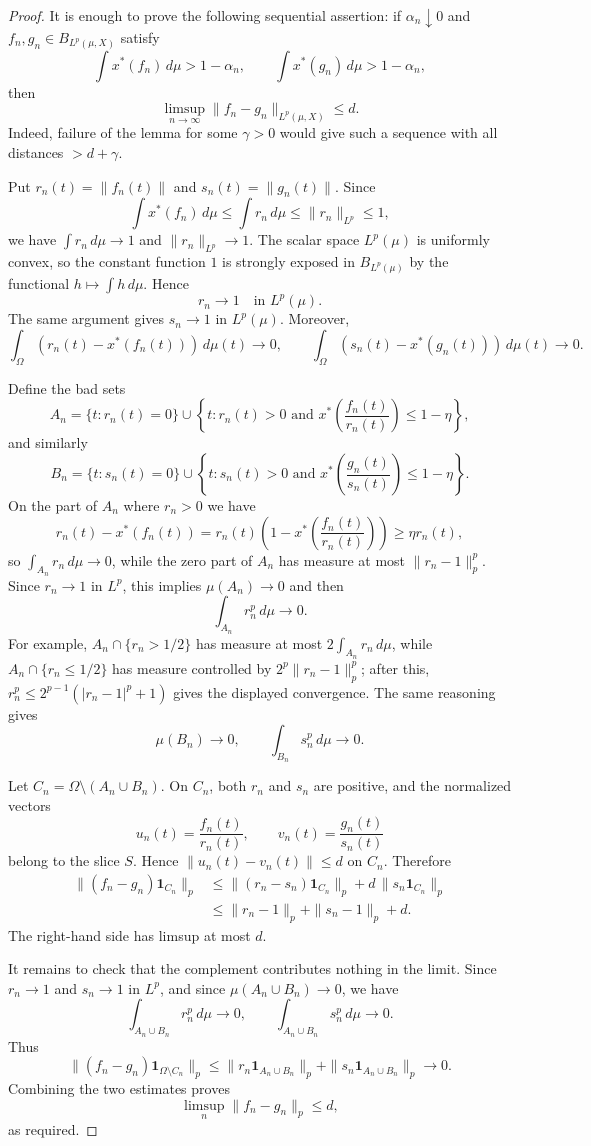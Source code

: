 \documentclass[11pt]{article}
\begin{document}
\begin{proof}
It is enough to prove the following sequential assertion: if \(\alpha_n\downarrow0\) and \(f_n,g_n\in B_{L^p(\mu,X)}\) satisfy
\[
  \int x^*(f_n)\,d\mu>1-\alpha_n,
  \qquad
  \int x^*(g_n)\,d\mu>1-\alpha_n,
\]
then
\[
  \limsup_{n\to\infty}\|f_n-g_n\|_{L^p(\mu,X)}\le d .
\]
Indeed, failure of the lemma for some \(\gamma>0\) would give such a sequence with all distances \(>d+\gamma\).

Put \(r_n(t)=\|f_n(t)\|\) and \(s_n(t)=\|g_n(t)\|\).  Since
\[
  \int x^*(f_n)\,d\mu
  \le \int r_n\,d\mu
  \le \|r_n\|_{L^p}
  \le 1,
\]
we have \(\int r_n\,d\mu\to1\) and \(\|r_n\|_{L^p}\to1\).  The scalar space \(L^p(\mu)\) is uniformly convex, so the constant function \(1\) is strongly exposed in \(B_{L^p(\mu)}\) by the functional \(h\mapsto\int h\,d\mu\).  Hence
\[
  r_n\to 1\quad\text{in }L^p(\mu).
\]
The same argument gives \(s_n\to1\) in \(L^p(\mu)\).  Moreover,
\[
  \int_\Omega (r_n(t)-x^*(f_n(t)))\,d\mu(t)\to0,
  \qquad
  \int_\Omega (s_n(t)-x^*(g_n(t)))\,d\mu(t)\to0.
\]

Define the bad sets
\[
  A_n=\{t:r_n(t)=0\}\cup\left\{t:r_n(t)>0\text{ and }
  x^*\!\left(\frac{f_n(t)}{r_n(t)}\right)\le1-\eta\right\},
\]
and similarly
\[
  B_n=\{t:s_n(t)=0\}\cup\left\{t:s_n(t)>0\text{ and }
  x^*\!\left(\frac{g_n(t)}{s_n(t)}\right)\le1-\eta\right\}.
\]
On the part of \(A_n\) where \(r_n>0\) we have
\[
  r_n(t)-x^*(f_n(t))
  =
  r_n(t)\left(1-x^*\!\left(\frac{f_n(t)}{r_n(t)}\right)\right)
  \ge \eta r_n(t),
\]
so \(\int_{A_n} r_n\,d\mu\to0\), while the zero part of \(A_n\) has measure at most \(\|r_n-1\|_p^p\).  Since \(r_n\to1\) in \(L^p\), this implies \(\mu(A_n)\to0\) and then
\[
  \int_{A_n} r_n^p\,d\mu\to0.
\]
For example, \(A_n\cap\{r_n>1/2\}\) has measure at most \(2\int_{A_n}r_n\,d\mu\), while \(A_n\cap\{r_n\le1/2\}\) has measure controlled by \(2^p\|r_n-1\|_p^p\); after this, \(r_n^p\le 2^{p-1}(|r_n-1|^p+1)\) gives the displayed convergence.  The same reasoning gives
\[
  \mu(B_n)\to0,\qquad \int_{B_n}s_n^p\,d\mu\to0.
\]

Let \(C_n=\Omega\setminus(A_n\cup B_n)\).  On \(C_n\), both \(r_n\) and \(s_n\) are positive, and the normalized vectors
\[
  u_n(t)=\frac{f_n(t)}{r_n(t)},\qquad
  v_n(t)=\frac{g_n(t)}{s_n(t)}
\]
belong to the slice \(S\).  Hence \(\|u_n(t)-v_n(t)\|\le d\) on \(C_n\).  Therefore
\[
\begin{aligned}
  \|(f_n-g_n)\mathbf 1_{C_n}\|_p
  &\le
  \|(r_n-s_n)\mathbf 1_{C_n}\|_p
  + d\,\|s_n\mathbf 1_{C_n}\|_p  \\
  &\le
  \|r_n-1\|_p+\|s_n-1\|_p+d.
\end{aligned}
\]
The right-hand side has limsup at most \(d\).

It remains to check that the complement contributes nothing in the limit.  Since \(r_n\to1\) and \(s_n\to1\) in \(L^p\), and since \(\mu(A_n\cup B_n)\to0\), we have
\[
  \int_{A_n\cup B_n} r_n^p\,d\mu\to0,\qquad
  \int_{A_n\cup B_n} s_n^p\,d\mu\to0.
\]
Thus
\[
  \|(f_n-g_n)\mathbf 1_{\Omega\setminus C_n}\|_p
  \le
  \|r_n\mathbf 1_{A_n\cup B_n}\|_p
  +
  \|s_n\mathbf 1_{A_n\cup B_n}\|_p
  \to0.
\]
Combining the two estimates proves
\[
  \limsup_n \|f_n-g_n\|_p\le d,
\]
as required.
\end{proof}
\end{document}
